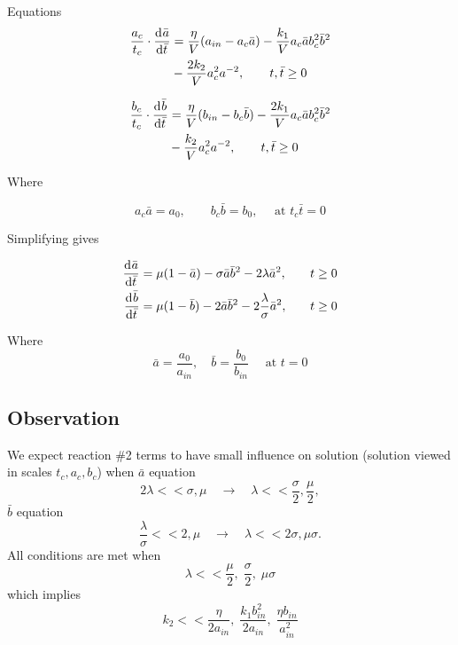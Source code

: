 \documentclass[12pt,twoside]{article}
\begin{document}
Equations
\begin{equation}
  \begin{aligned}
    \frac{a_c}{t_c}\cdot\frac{\mathrm{d}^{} {\bar{a}}}{\mathrm{d}{\bar{t}}^{}} &= \frac{\eta}{V}(a_{in}-a_c\bar{a})-\frac{k_1}{V}a_c\bar{a}b_c^2\bar{b}^2 \\
    &- \frac{2k_2}{V}a_c^2a^{-2},\qquad t,\bar{t}\ge 0 \\
  \end{aligned}
\end{equation}

\begin{equation}
  \begin{aligned}
    \frac{b_c}{t_c}\cdot\frac{\mathrm{d}^{} {\bar{b}}}{\mathrm{d}{\bar{t}}^{}} &= \frac{\eta}{V}(b_{in}-b_c\bar{b})-\frac{2k_1}{V}a_c\bar{a}b_c^2\bar{b}^2 \\
    &- \frac{k_2}{V}a_c^2a^{-2},\qquad t,\bar{t}\ge 0 \\
  \end{aligned}
\end{equation}

Where

\begin{equation}
  a_c\bar{a} = a_0, \qquad b_c\bar{b} = b_0, \quad\text{ at } t_c\bar{t} = 0
\end{equation}

Simplifying gives

\begin{equation}
  \begin{aligned}
    \frac{\mathrm{d}^{} {\bar{a}}}{\mathrm{d}{\bar{t}}^{}} &= \mu(1-\bar{a}) - \sigma\bar{a}\bar{b}^2 - 2\lambda\bar{a}^2, &\quad t&\ge0 \\
    \frac{\mathrm{d}^{} {\bar{b}}}{\mathrm{d}{\bar{t}}^{}} &= \mu(1-\bar{b}) - 2\bar{a}\bar{b}^2 - 2\frac{\lambda}{\sigma}\bar{a}^2, &\quad t&\ge0 \\
  \end{aligned}
\end{equation}

Where
\begin{equation}
  \bar{a} = \frac{a_0}{a_{in}}, \quad \bar{b} = \frac{b_0}{b_{in}} \quad \text{ at } t=0
\end{equation}


\subsection{Observation}
We expect reaction \#2 terms to have small influence on solution (solution
viewed in scales $t_c, a_c, b_c$) when $\bar{a}$ equation
$$2\lambda << \sigma, \mu \quad\longrightarrow\quad \lambda << \frac{\sigma}{2},\frac{\mu}{2},$$
$\bar{b}$ equation
$$\frac{\lambda}{\sigma} << 2, \mu \quad\longrightarrow\quad \lambda << 2\sigma, \mu\sigma.$$
All conditions are met when
$$\lambda << \frac{\mu}{2},\; \frac{\sigma}{2},\;\mu\sigma$$ which implies
$$k_2 << \frac{\eta}{2a_{in}},\; \frac{k_1b_{in}^2}{2a_{in}},\; \frac{\eta b_{in}}{a_{in}^2}$$
\end{document}
